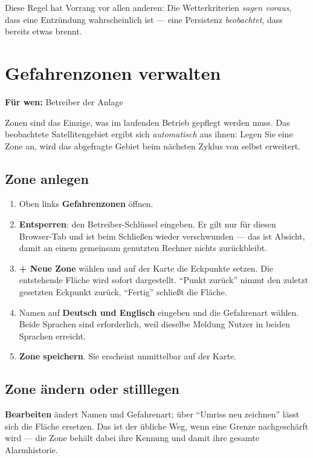\documentclass[11pt,a4paper,DIV=12,parskip=half]{scrartcl}
\newcommand{\zielgruppe}[1]{\begin{fuerwen}\textbf{Für wen:} #1\end{fuerwen}}
\begin{document}
Diese Regel hat Vorrang vor allen anderen: Die Wetterkriterien \emph{sagen
voraus}, dass eine Entzündung wahrscheinlich ist --- eine Persistenz
\emph{beobachtet}, dass bereits etwas brennt.

\section{Gefahrenzonen verwalten}\label{sec:zonen}
\zielgruppe{Betreiber der Anlage}

Zonen sind das Einzige, was im laufenden Betrieb gepflegt werden muss. Das
beobachtete Satellitengebiet ergibt sich \emph{automatisch} aus ihnen: Legen
Sie eine Zone an, wird das abgefragte Gebiet beim nächsten Zyklus von selbst
erweitert.

\subsection{Zone anlegen}

\begin{enumerate}[leftmargin=*]
  \item Oben links \textbf{Gefahrenzonen} öffnen.
  \item \textbf{Entsperren}: den Betreiber-Schlüssel eingeben. Er gilt nur für
    diesen Browser-Tab und ist beim Schließen wieder verschwunden --- das ist
    Absicht, damit an einem gemeinsam genutzten Rechner nichts zurückbleibt.
  \item \textbf{+ Neue Zone} wählen und auf der Karte die Eckpunkte setzen.
    Die entstehende Fläche wird sofort dargestellt. \enquote{Punkt zurück}
    nimmt den zuletzt gesetzten Eckpunkt zurück, \enquote{Fertig} schließt die
    Fläche.
  \item Namen auf \textbf{Deutsch und Englisch} eingeben und die Gefahrenart
    wählen. Beide Sprachen sind erforderlich, weil dieselbe Meldung Nutzer in
    beiden Sprachen erreicht.
  \item \textbf{Zone speichern}. Sie erscheint unmittelbar auf der Karte.
\end{enumerate}

\subsection{Zone ändern oder stilllegen}

\textbf{Bearbeiten} ändert Namen und Gefahrenart; über
\enquote{Umriss neu zeichnen} lässt sich die Fläche ersetzen. Das ist der
übliche Weg, wenn eine Grenze nachgeschärft wird --- die Zone behält dabei
ihre Kennung und damit ihre gesamte Alarmhistorie.
\end{document}
